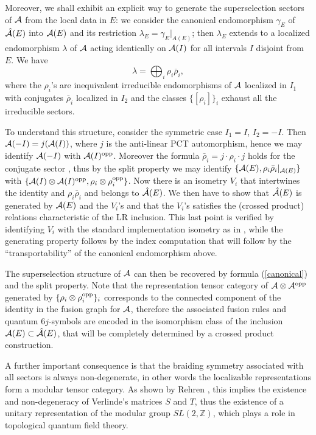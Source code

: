 \documentclass[12pt]{article}
\def\o{{\rm opp}}
\def\A{{\cal A}}
\def\AA{{\A\otimes \A^{\rm opp}}}
\begin{document}
Moreover, we shall exhibit an explicit way to generate the superselection
sectors of $\A$ from the local data in $E$: we consider the canonical
endomorphism $\gamma_E$ of $\hat \A(E)$ into $\A(E)$ and its
restriction $\lambda_E = \gamma_E |_{A(E)}$; then $\lambda_E$ extends
to a localized endomorphism $\lambda$ of $\A$ acting identically on
$\A(I)$ for all intervals $I$ disjoint from $E$. We have
\begin{equation}
\lambda = \bigoplus_i \rho_i \bar\rho_i,
        \label{canonical}
\end{equation}
where the $\rho_i$'s are inequivalent irreducible endomorphisms of
$\A$ localized in $I_1$ with conjugates $\bar\rho_i$ localized in
$I_2$ and the classes $\{[\rho_i]\}_i$ exhaust all the irreducible
sectors.

To understand this structure, consider the symmetric case $I_1=I$, $I_2= -I$.
Then $\A(-I) = j(\A(I))$, where $j$ is the anti-linear PCT
automorphism, hence we may identify $\A(-I)$ with $\A(I)^\o$. Moreover
the formula $\bar\rho_i = j\cdot\rho_i\cdot j$ holds for the conjugate
sector \cite{GL}, thus by the split property we may identify
$\{\A(E), \rho_i \bar\rho_i |_{\A(E)}\}$ with
$\{\A(I)\otimes\A(I)^\o, \rho_i \otimes\rho_i^{\o}\}$.
Now there is an isometry $V_i$ that intertwines the identity and
$\rho_i\bar\rho_i$ and belongs to $\hat\A(E)$. We then have to show
that $\hat\A(E)$ is generated by $\A(E)$ and the $V_i$'s and that
the $V_i$'s satisfies the (crossed product) relations characteristic of
the LR inclusion. This last point is verified by  identifying $V_i$
with the standard implementation isometry as in \cite{GL}, while
the generating property follows by the index computation that will
follow by the ``transportability'' of the canonical endomorphism above.

The superselection structure of $\A$ can then be recovered
by formula (\ref{canonical}) and the split property.
Note that the representation tensor category of $\AA$ generated
by $\{\rho_i\otimes\rho_i^\o\}_i$ corresponds to the connected
component of the identity in the fusion graph for $\A$, therefore the
associated fusion rules and quantum $6j$-symbols
are encoded in the isomorphism class of
the inclusion $\A(E)\subset\hat \A(E)$, that will be completely
determined by a crossed product construction.

A further important consequence is that the braiding symmetry
associated with all sectors is always non-degenerate, in other words
the localizable representations form a modular tensor category. As shown by
Rehren \cite{R1}, this implies the existence and
non-degeneracy of Verlinde's matrices $S$ and $T$,
thus the existence of a unitary representation of the
modular group $SL(2,\mathbb Z)$, which plays a role in
topological quantum field theory.
\end{document}
